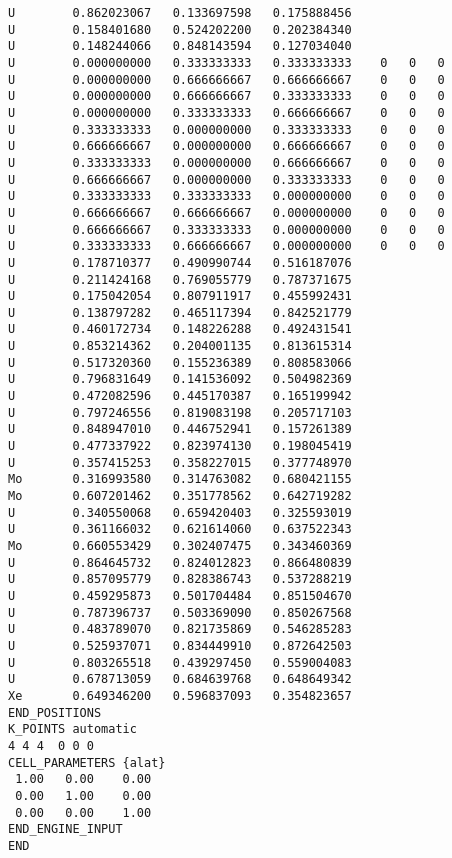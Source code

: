 \begin{lstlisting}
U        0.862023067   0.133697598   0.175888456
U        0.158401680   0.524202200   0.202384340
U        0.148244066   0.848143594   0.127034040
U        0.000000000   0.333333333   0.333333333    0   0   0
U        0.000000000   0.666666667   0.666666667    0   0   0
U        0.000000000   0.666666667   0.333333333    0   0   0
U        0.000000000   0.333333333   0.666666667    0   0   0
U        0.333333333   0.000000000   0.333333333    0   0   0
U        0.666666667   0.000000000   0.666666667    0   0   0
U        0.333333333   0.000000000   0.666666667    0   0   0
U        0.666666667   0.000000000   0.333333333    0   0   0
U        0.333333333   0.333333333   0.000000000    0   0   0
U        0.666666667   0.666666667   0.000000000    0   0   0
U        0.666666667   0.333333333   0.000000000    0   0   0
U        0.333333333   0.666666667   0.000000000    0   0   0
U        0.178710377   0.490990744   0.516187076
U        0.211424168   0.769055779   0.787371675
U        0.175042054   0.807911917   0.455992431
U        0.138797282   0.465117394   0.842521779
U        0.460172734   0.148226288   0.492431541
U        0.853214362   0.204001135   0.813615314
U        0.517320360   0.155236389   0.808583066
U        0.796831649   0.141536092   0.504982369
U        0.472082596   0.445170387   0.165199942
U        0.797246556   0.819083198   0.205717103
U        0.848947010   0.446752941   0.157261389
U        0.477337922   0.823974130   0.198045419
U        0.357415253   0.358227015   0.377748970
Mo       0.316993580   0.314763082   0.680421155
Mo       0.607201462   0.351778562   0.642719282
U        0.340550068   0.659420403   0.325593019
U        0.361166032   0.621614060   0.637522343
Mo       0.660553429   0.302407475   0.343460369
U        0.864645732   0.824012823   0.866480839
U        0.857095779   0.828386743   0.537288219
U        0.459295873   0.501704484   0.851504670
U        0.787396737   0.503369090   0.850267568
U        0.483789070   0.821735869   0.546285283
U        0.525937071   0.834449910   0.872642503
U        0.803265518   0.439297450   0.559004083
U        0.678713059   0.684639768   0.648649342
Xe       0.649346200   0.596837093   0.354823657
END_POSITIONS
K_POINTS automatic
4 4 4  0 0 0
CELL_PARAMETERS {alat}
 1.00   0.00    0.00
 0.00   1.00    0.00
 0.00   0.00    1.00
END_ENGINE_INPUT
END

\end{lstlisting}


\newpage
